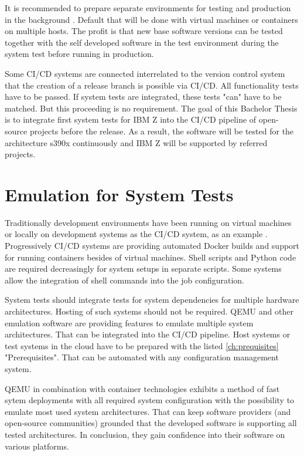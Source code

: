 It is recommended to prepare separate environments for testing and production in the background \cite[~p.120]{Scholl2019}. 
Default that will be done with virtual machines or containers on multiple hosts. The profit is that new base software versions can be tested together with the self developed software in the test environment during the system test before running in production.

Some CI/CD systems are connected interrelated to the version control system that the creation of a release branch is possible via CI/CD. All functionality tests have to be passed.  If system tests are integrated, these tests "can" have to be matched. But this proceeding is no requirement. The goal of this Bachelor Thesis is to integrate first system tests for IBM Z into the CI/CD pipeline of open-source projects before the release. As a result, the software will be tested for the architecture s390x continuously and IBM Z will be supported by referred projects.

\section{Emulation for System Tests}

Traditionally development environments have been running on virtual machines or locally on development systems as the CI/CD system, as an example \cite[~p.123]{Scholl2019}. Progressively CI/CD systems are providing automated Docker builds and support for running containers besides of virtual machines. 
Shell scripts and Python code are required decreasingly for system setups in separate scripts. Some systems allow the integration of shell commands into the job configuration.

System tests should integrate tests for system dependencies for multiple hardware architectures. Hosting of such systems should not be required. QEMU and other emulation software are providing features to emulate multiple system architectures.
That can be integrated into the CI/CD pipeline. Host systems or test systems in the cloud have to be prepared with the listed \ref{ch:prequisites} "Prerequisites". That can be automated with any configuration management system.

QEMU in combination with container technologies exhibits a method of fast sytem deployments with all required system configuration with the possibility to emulate most used system architectures. That can keep software providers (and open-source communities) grounded that the developed software is supporting all tested architectures. 
In conclusion, they gain confidence into their software on various platforms.